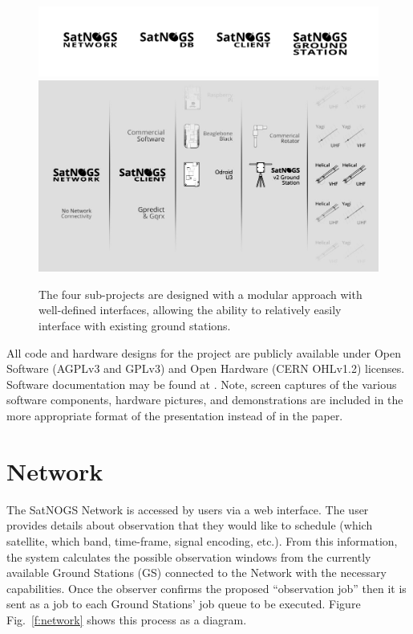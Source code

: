 \documentclass[conference,12pt]{IEEEtran}
\newcommand{\figref}[1]{Fig.~\ref{#1}}
\newlength{\figwidth}
\begin{document}
\begin{figure}[htbp]
\centering
\includegraphics[width=\figwidth]{fig/four-components-titles-invert}
\includegraphics[width=\figwidth]{fig/modular-options}
\caption{The four sub-projects are designed with a modular approach with well-defined interfaces, allowing the ability to relatively easily interface with existing ground stations.}
\label{f:modular}
\end{figure}

All code and hardware designs for the project are publicly available \cite{SatNOGS-github} under Open Software (AGPLv3 and GPLv3) and Open Hardware (CERN OHLv1.2) licenses.
Software documentation may be found at \cite{SatNOGS-docs}.
Note, screen captures of the various software components, hardware pictures, and demonstrations are included in the more appropriate format of the presentation instead of in the paper.


\section{Network}
The SatNOGS Network is accessed by users via a web interface.
The user provides details about observation that they would like to schedule (which satellite, which band, time-frame, signal encoding, etc.).
From this information, the system calculates the possible observation windows from the currently available Ground Stations (GS) connected to the Network with the necessary capabilities.
Once the observer confirms the proposed ``observation job'' then it is sent as a job to each Ground Stations' job queue to be executed.
Figure \figref{f:network} shows this process as a diagram.
\end{document}
